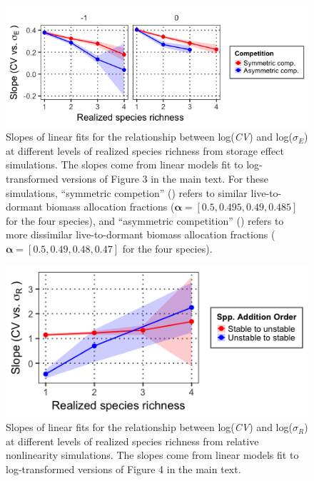 \documentclass[11pt,]{article}
\begin{document}
\newpage{}

\begin{figure}[!ht]
  \centering
      \includegraphics[width=5in]{./components/storage_effect_div+envar_varycomp_loglog_slopes.png}
  \caption{Slopes of linear fits for the relationship between log(\emph{CV}) and log($\sigma_E$) at different levels of realized species richness from storage effect simulations. The slopes come from linear models fit to log-transformed versions of Figure 3 in the main text. For these simulations, ``symmetric competion'' (\tikzcircle{1.5pt}) refers to similar live-to-dormant biomass allocation fractions ($\boldsymbol{\alpha} = [0.5, 0.495, 0.49, 0.485]$ for the four species), and ``asymmetric competition'' (\tikzcircle[fill=blue]{1.5pt}) refers to more dissimilar live-to-dormant biomass allocation fractions ($\boldsymbol{\alpha} = [0.5, 0.49, 0.48, 0.47]$ for the four species).}
\end{figure}

\newpage{}

\begin{figure}[!ht]
  \centering
      \includegraphics[width=5in]{./components/relative_nonlinearity_div+envar_loglog_slopes.png}
  \caption{Slopes of linear fits for the relationship between log(\emph{CV}) and log($\sigma_R$) at different levels of realized species richness from relative nonlinearity simulations. The slopes come from linear models fit to log-transformed versions of Figure 4 in the main text.}
\end{figure}
\end{document}
